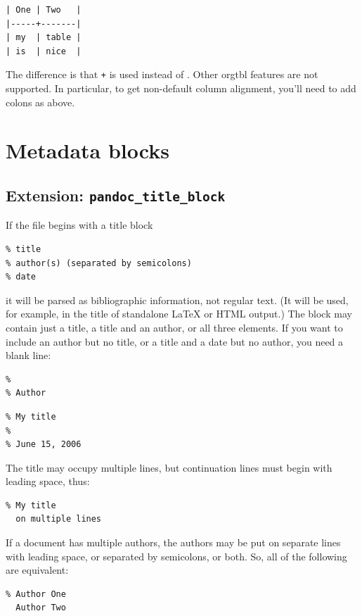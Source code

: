\documentclass[
  b5paper
]{book}
\begin{document}
\begin{verbatim}
| One | Two   |
|-----+-------|
| my  | table |
| is  | nice  |
\end{verbatim}

The difference is that \texttt{+} is used instead of
\texttt{\textbar{}}. Other orgtbl features are not supported. In
particular, to get non-default column alignment, you'll need to add
colons as above.

\section{Metadata blocks}\label{metadata-blocks}

\subsection{\texorpdfstring{Extension:
\texttt{pandoc\_title\_block}}{Extension: pandoc\_title\_block}}\label{extension-pandoc_title_block}

If the file begins with a title block

\begin{verbatim}
% title
% author(s) (separated by semicolons)
% date
\end{verbatim}

it will be parsed as bibliographic information, not regular text. (It
will be used, for example, in the title of standalone LaTeX or HTML
output.) The block may contain just a title, a title and an author, or
all three elements. If you want to include an author but no title, or a
title and a date but no author, you need a blank line:

\begin{verbatim}
%
% Author
\end{verbatim}

\begin{verbatim}
% My title
%
% June 15, 2006
\end{verbatim}

The title may occupy multiple lines, but continuation lines must begin
with leading space, thus:

\begin{verbatim}
% My title
  on multiple lines
\end{verbatim}

If a document has multiple authors, the authors may be put on separate
lines with leading space, or separated by semicolons, or both. So, all
of the following are equivalent:

\begin{verbatim}
% Author One
  Author Two
\end{verbatim}
\end{document}

